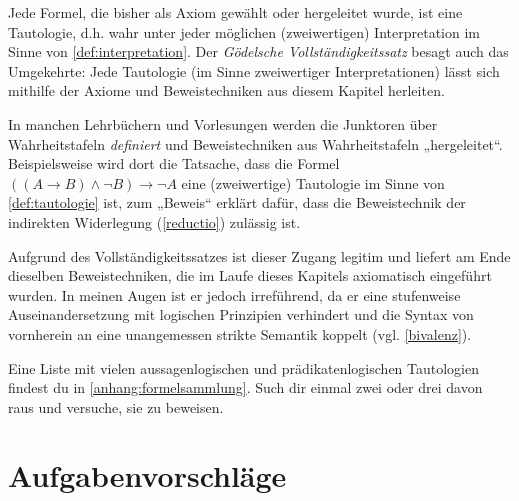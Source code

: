 \begin{bem} \label{goedelvollstaendig}
    Jede Formel, die bisher als Axiom gewählt oder hergeleitet wurde, ist eine Tautologie, d.h. wahr unter jeder möglichen (zweiwertigen) Interpretation im Sinne von \cref{def:interpretation}. Der \emph{Gödelsche Vollständigkeitssatz} besagt auch das Umgekehrte: Jede Tautologie (im Sinne zweiwertiger Interpretationen) lässt sich mithilfe der Axiome und Beweistechniken aus diesem Kapitel herleiten.
    
    In manchen Lehrbüchern und Vorlesungen werden die Junktoren über Wahrheitstafeln \emph{definiert} und Beweistechniken aus Wahrheitstafeln „hergeleitet“. Beispielsweise wird dort die Tatsache, dass die Formel $((A\to B)\land \neg B)\to \neg A$ eine (zweiwertige) Tautologie im Sinne von \cref{def:tautologie} ist, zum „Beweis“ erklärt dafür, dass die Beweistechnik der indirekten Widerlegung (\cref{reductio}) zulässig ist.

    Aufgrund des Vollständigkeitssatzes ist dieser Zugang legitim und liefert am Ende dieselben Beweistechniken, die im Laufe dieses Kapitels axiomatisch eingeführt wurden. In meinen Augen ist er jedoch irreführend, da er eine stufenweise Auseinandersetzung mit logischen Prinzipien verhindert und die Syntax von vornherein an eine unangemessen strikte Semantik koppelt (vgl. \cref{bivalenz}).
\end{bem}


\begin{bem}
    Eine Liste mit vielen aussagenlogischen und prädikatenlogischen Tautologien findest du in \cref{anhang:formelsammlung}. Such dir einmal zwei oder drei davon raus und versuche, sie zu beweisen.
\end{bem}





\clearpage
\section{Aufgabenvorschläge}


